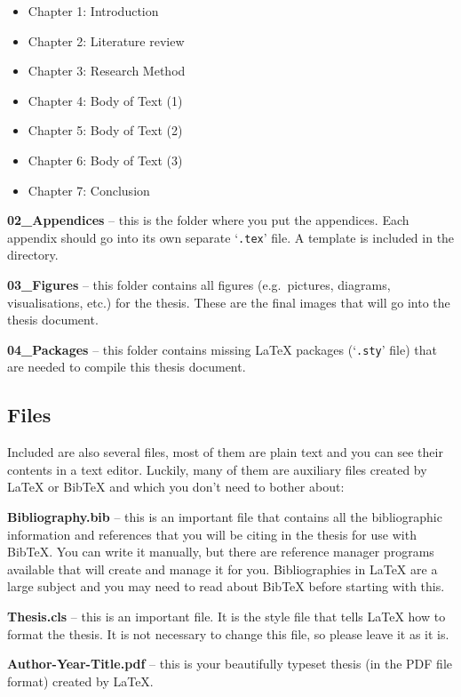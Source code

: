\begin{itemize}
    \item Chapter 1: Introduction
    \item Chapter 2: Literature review
    \item Chapter 3: Research Method
    \item Chapter 4: Body of Text (1)
    \item Chapter 5: Body of Text (2)
    \item Chapter 6: Body of Text (3)
    \item Chapter 7: Conclusion
\end{itemize}

\textbf{02\_Appendices} -- this is the folder where you put the appendices. Each appendix should go into its own separate `\texttt{.tex}' file. A template is included in the directory.

\textbf{03\_Figures} -- this folder contains all figures (e.g.~pictures, diagrams, visualisations, etc.) for the thesis. These are the final images that will go into the thesis document.

\textbf{04\_Packages} -- this folder contains missing \LaTeX{} packages (`\texttt{.sty}' file) that are needed to compile this thesis document.

\subsection{Files}

Included are also several files, most of them are plain text and you can see their contents in a text editor. Luckily, many of them are auxiliary files created by \LaTeX{} or BibTeX and which you don't need to bother about:

\textbf{Bibliography.bib} -- this is an important file that contains all the bibliographic information and references that you will be citing in the thesis for use with BibTeX. You can write it manually, but there are reference manager programs available that will create and manage it for you. Bibliographies in \LaTeX{} are a large subject and you may need to read about BibTeX before starting with this.

\textbf{Thesis.cls} -- this is an important file. It is the style file that tells \LaTeX{} how to format the thesis. It is not necessary to change this file, so please leave it as it is.

\textbf{Author-Year-Title.pdf} -- this is your beautifully typeset thesis (in the PDF file format) created by \LaTeX{}.

